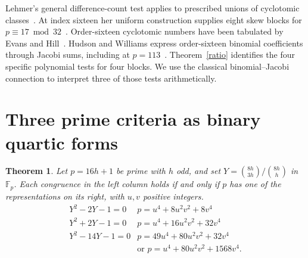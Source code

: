 \documentclass[11pt]{article}
\newtheorem{theorem}{Theorem}
\begin{document}
Lehmer's general difference-count test applies to prescribed unions of cyclotomic classes~\cite{Leh76}. At index sixteen her uniform construction supplies eight skew blocks for $p\equiv17\bmod32$~\cite{Leh74,MX}. Order-sixteen cyclotomic numbers have been tabulated by Evans and Hill~\cite{EH}. Hudson and Williams express order-sixteen binomial coefficients through Jacobi sums, including at $p=113$~\cite{HW}. Theorem~\ref{ratio} identifies the four specific polynomial tests for four blocks. We use the classical binomial--Jacobi connection to interpret three of those tests arithmetically.

\section{Three prime criteria as binary quartic forms}\label{sec:quartic-prime-forms}

\begin{theorem}\label{thm:quartic-prime-forms}
Let $p=16h+1$ be prime with $h$ odd, and set
$Y=\binom{8h}{3h}/\binom{8h}{h}$ in $\mathbb F_p$.
Each congruence in the left column holds if and only if $p$ has one
of the representations on its right, with $u,v$ positive integers.
\[
\begin{array}{c|l}
Y^2-2Y-1=0 & p=u^4+8u^2v^2+8v^4\\
Y^2+2Y-1=0 & p=u^4+16u^2v^2+32v^4\\
Y^2-14Y-1=0 & p=49u^4+80u^2v^2+32v^4\\
             & \text{or }p=u^4+80u^2v^2+1568v^4 .
\end{array}
\]
\end{theorem}
\end{document}

